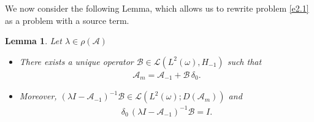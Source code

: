 \documentclass[10pt, a4]{amsart}
\theoremstyle{plain}
\newtheorem{lemma}{Lemma}[section]
\theoremstyle{definition}
\theoremstyle{remark}
\numberwithin{equation}{section}
\begin{document}
We now consider the following Lemma, which allows us to rewrite problem \eqref{e2.1} as a problem with a source term. 
\begin{lemma}\label{l2.4}
    Let $\lambda\in\rho(\mathcal{A})$ 
\begin{itemize}
    \item[1.]  There exists a unique operator \(\mathcal{B} \in \mathcal{L}(L^2(\omega), H_{-1})\) such that
    \begin{align}\label{e2.4}
        \mathcal{A}_m = \mathcal{A}_{-1} + \mathcal{B}\, \delta_0.
    \end{align}
\item[2.]   Moreover, \((\lambda I -\mathcal{A}_{-1})^{-1}\mathcal{B} \in \mathcal{L}(L^2(\omega); D(\mathcal{A}_m))\) and
\begin{align}
    \delta_0\, (\lambda I - \mathcal{A}_{-1})^{-1}\mathcal{B} = I.
\end{align}
\end{itemize}
\end{lemma}
\end{document}
